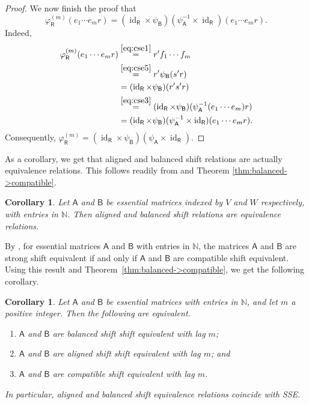 \documentclass[11pt, letterpaper,final]{amsart}
\newcommand{\bbN}{{\mathbb{N}}}
\newcommand{\id}{\operatorname{id}}
\newtheorem{cor}[thm]{Corollary}
\theoremstyle{definition}
\begin{document}
\begin{proof}
We now finish the proof that 
$$
\varphi_\mathsf{R}^{(m)}( e_1 \cdots e_m r)=(\id_\mathsf{R} \times \psi_\mathsf{B})(\psi_\mathsf{A}^{-1} \times \id_\mathsf{R})( e_1\cdots e_m r).
$$
Indeed,
\begin{align*}
    \varphi_\mathsf{R}^{(m)} ( e_1 \cdots e_m r ) &\overset{\eqref{eq:cse1}}{=} r' f_1 \cdots f_m \\
                &\overset{\eqref{eq:cse5}}{=} r' \psi_\mathsf{B}(s'r)  \\
                &= (\id_\mathsf{R} \times \psi_\mathsf{B})(r's'r) \\
                &\overset{\eqref{eq:cse3}}{=}(\id_\mathsf{R} \times \psi_\mathsf{B})(\psi_\mathsf{A}^{-1}(e_1\cdots e_m)r) \\
    &=(\id_\mathsf{R} \times \psi_\mathsf{B})(\psi_\mathsf{A}^{-1} \times \id_\mathsf{R}) (e_1\cdots e_m r).
\end{align*}
Consequently, $\varphi_\mathsf{R}^{(m)} =(\id_\mathsf{R} \times \psi_\mathsf{B})(\psi_\mathsf{A} \times \id_\mathsf{R})$.
\end{proof}

As a corollary, we get that aligned and balanced shift relations are actually equivalence relations. This follows readily from \cite[Proposition 4.4]{CDE} and Theorem \ref{thm:balanced->compatible}.

\begin{cor}
Let $\mathsf{A}$ and $\mathsf{B}$ be essential matrices indexed by $V$ and $W$ respectively, with entries in $\bbN$. Then aligned and balanced shift relations are equivalence relations.
\end{cor}

By \cite[Theorem~1.3]{CDE}, for essential matrices $\mathsf{A}$ and $\mathsf{B}$ with entries in $\bbN$, the matrices $\mathsf{A}$ and $\mathsf{B}$ are strong shift equivalent if and only if $\mathsf{A}$ and $\mathsf{B}$ are compatible shift equivalent.  Using this result and Theorem~\ref{thm:balanced->compatible}, we get the following corollary.

\begin{cor}\label{cor-matrices-equivalent-relations}
Let $\mathsf{A}$ and $\mathsf{B}$ be essential matrices with entries in $\bbN$, and let $m$ a positive integer. Then the following are equivalent.
\begin{enumerate}

\item $\mathsf{A}$ and $\mathsf{B}$ are balanced shift shift equivalent  with lag $m$;

\item $\mathsf{A}$ and $\mathsf{B}$ are aligned shift shift equivalent  with lag $m$; and

\item $\mathsf{A}$ and $\mathsf{B}$ are compatible shift equivalent with lag $m$.
\end{enumerate}
In particular, aligned and balanced shift equivalence relations coincide with SSE.
\end{cor}
\end{document}
